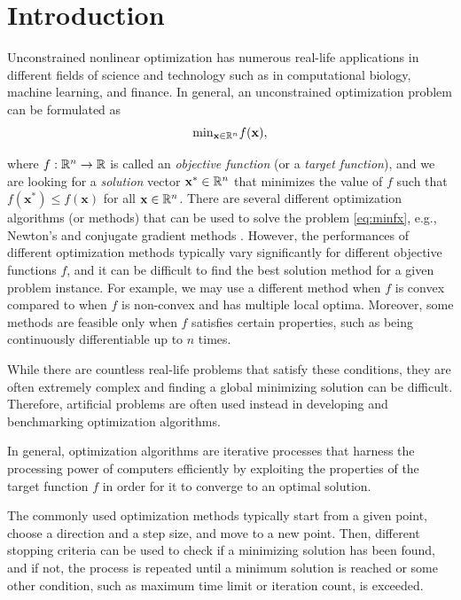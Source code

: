 \documentclass[a4paper,english,titlepage,12pt]{article}
\newcommand{\vect}[1]{\ensuremath{\mathbf{#1}}}
\newcommand{\R}{\ensuremath\mathbb{R}}
\begin{document}
\section{Introduction}

Unconstrained nonlinear optimization has numerous real-life applications in different fields of science and technology such as in computational biology, machine learning, and finance.
In general, an unconstrained optimization problem can be formulated as
\begin{equation}\label{eq:minfx}
    \mathrm{min}_{\vect{x} \in \R^n} f(\vect{x}),
\end{equation}

where $f : \R^n \rightarrow \R$ is called an \emph{objective function} (or a \emph{target function}), and we are looking for a \emph{solution} vector $\vect{x}^* \in \R^n$ that minimizes the value of $f$ such that $f(\vect{x}^*) \leq f(\vect{x})$ for all $\vect{x}\in \R^n$. There are several different optimization algorithms (or methods) that can be used to solve the problem \eqref{eq:minfx}, e.g., Newton's and conjugate gradient methods \cite{book:nonlinear_programming}. However, the performances of different optimization methods typically vary significantly for different objective functions $f$, and it can be difficult to find the best solution method for a given problem instance. For example, we may use a different method when $f$ is convex compared to when $f$ is non-convex and has multiple local optima. Moreover, some methods are feasible only when $f$ satisfies certain properties, such as being continuously differentiable up to $n$ times.

While there are countless real-life problems that satisfy these conditions, they are often extremely complex and finding a global minimizing solution can be difficult.
Therefore, artificial problems are often used instead in developing and benchmarking optimization algorithms. \cite{test_function_collection_artifical}

In general, optimization algorithms are iterative processes that harness the processing power of computers efficiently by exploiting the properties of the target function $f$ in order for it to converge to an optimal solution.

The commonly used optimization methods typically start from a given point, choose a direction and a step size, and move to a new point. Then, different stopping criteria can be used to check if a minimizing solution has been found, and if not, the process is repeated until a minimum solution is reached or some other condition, such as maximum time limit or iteration count, is exceeded.
\end{document}
